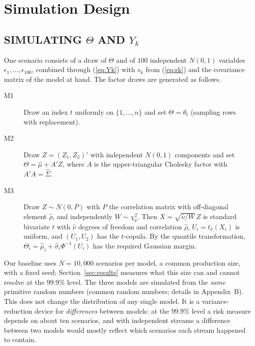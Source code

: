 \section{Simulation Design}
\label{sec:simulation}

\subsection{SIMULATING $\Theta$ AND $Y_k$}
\label{subsec:simtheta}
One scenario consists of a draw of $\Theta$ and of $100$ independent $N(0,1)$ variables $\epsilon_1,\dots,\epsilon_{100}$, combined through (\ref{eq:Yk}) with $s_k$ from (\ref{eq:sk}) and the covariance matrix of the model at hand. The factor draws are generated as follows.
\begin{description}
\item[M1] Draw an index $t$ uniformly on $\{1,\dots,n\}$ and set $\Theta=\theta_t$ (sampling rows with replacement).
\item[M2] Draw $Z=(Z_1,Z_2)'$ with independent $N(0,1)$ components and set $\Theta=\hat\mu+A'Z$, where $A$ is the upper-triangular Cholesky factor with $A'A=\hat\Sigma$.
\item[M3] Draw $Z\sim N(0,P)$ with $P$ the correlation matrix with off-diagonal element $\hat\rho$, and independently $W\sim\chi^2_{\hat\nu}$. Then $X=\sqrt{\hat\nu/W}\,Z$ is standard bivariate $t$ with $\hat\nu$ degrees of freedom and correlation $\hat\rho$, $U_i=t_{\hat\nu}(X_i)$ is uniform, and $(U_1,U_2)$ has the $t$-copula. By the quantile transformation, $\Theta_i=\hat\mu_i+\hat\sigma_i\Phi^{-1}(U_i)$ has the required Gaussian margin.
\end{description}
Our baseline uses $N=10{,}000$ scenarios per model, a common production size, with a fixed seed; Section~\ref{sec:results} measures what this size can and cannot resolve at the $99.9\%$ level. The three models are simulated from the \emph{same} primitive random numbers (common random numbers; details in Appendix~B). This does not change the distribution of any single model. It is a variance-reduction device for \emph{differences} between models: at the $99.9\%$ level a risk measure depends on about ten scenarios, and with independent streams a difference between two models would mostly reflect which scenarios each stream happened to contain.

